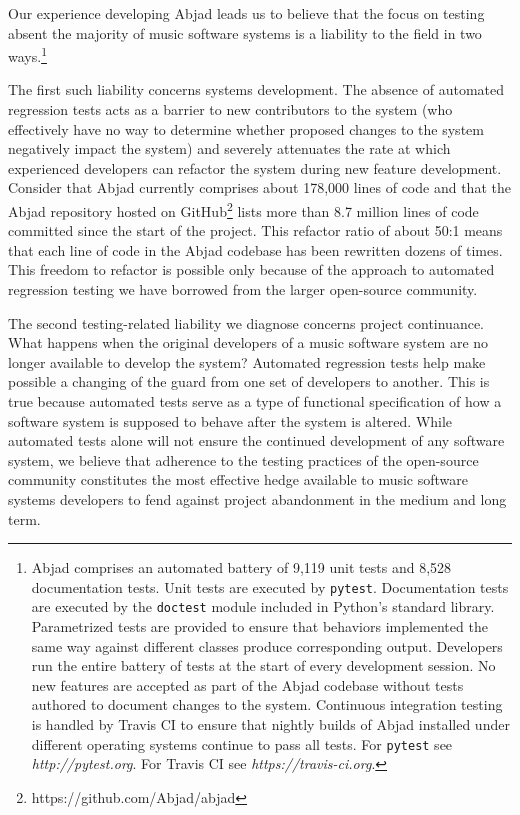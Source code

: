 \documentclass{article}
\begin{document}
Our experience developing Abjad leads us to believe that the focus on testing
absent the majority of music software systems is a liability to the field in
two ways.\footnote{Abjad comprises an automated battery of 9,119 unit tests and
8,528 documentation tests. Unit tests are executed by \texttt{pytest}.
Documentation tests are executed by the \texttt{doctest} module included in
Python's standard library. Parametrized tests are provided to ensure that
behaviors implemented the same way against different classes produce
corresponding output. Developers run the entire battery of tests at the start
of every development session. No new features are accepted as part of the Abjad
codebase without tests authored to document changes to the system. Continuous
integration testing is handled by Travis CI to ensure that nightly builds of
Abjad installed under different operating systems continue to pass all tests.
For \texttt{pytest} see \textit{http://pytest.org}. For Travis CI see
\textit{https://travis-ci.org}.}

The first such liability concerns systems development. The absence of automated
regression tests acts as a barrier to new contributors to the system (who
effectively have no way to determine whether proposed changes to the system
negatively impact the system) and severely attenuates the rate at which
experienced developers can refactor the system during new feature development.
Consider that Abjad currently comprises about 178,000 lines of code and that
the Abjad repository hosted on GitHub\footnote{https://github.com/Abjad/abjad}
lists more than 8.7 million lines of code committed since the start of the
project. This refactor ratio of about 50:1 means that each line of code in the
Abjad codebase has been rewritten dozens of times. This freedom to refactor is
possible only because of the approach to automated regression testing we have
borrowed from the larger open-source community.

The second testing-related liability we diagnose concerns project continuance.
What happens when the original developers of a music software system are no
longer available to develop the system? Automated regression tests help make
possible a changing of the guard from one set of developers to another. This is
true because automated tests serve as a type of functional specification of how
a software system is supposed to behave after the system is altered. While
automated tests alone will not ensure the continued development of any software
system, we believe that adherence to the testing practices of the open-source
community constitutes the most effective hedge available to music software
systems developers to fend against project abandonment in the medium and long
term.
\end{document}
